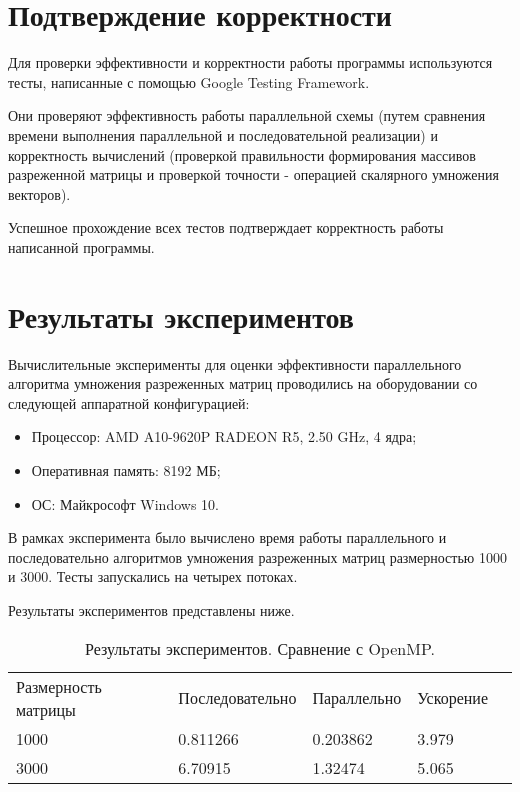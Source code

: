 \documentclass{report}
\begin{document}
\section*{Подтверждение корректности}
Для проверки эффективности и корректности работы программы используются тесты, написанные с помощью Google Testing Framework.
\par Они проверяют эффективность работы параллельной схемы (путем сравнения времени выполнения параллельной и последовательной реализации) и корректность вычислений (проверкой правильности формирования массивов разреженной матрицы и проверкой точности - операцией скалярного умножения векторов).

\par Успешное прохождение всех тестов подтверждает корректность работы написанной программы.

\newpage

\section*{Результаты экспериментов}
Вычислительные эксперименты для оценки эффективности параллельного алгоритма умножения разреженных матриц проводились на оборудовании со следующей аппаратной конфигурацией:

\begin{itemize}
\item Процессор: AMD A10-9620P RADEON R5, 2.50 GHz, 4 ядра;
\item Оперативная память: 8192 МБ;
\item ОС: Майкрософт Windows 10.
\end{itemize}

\par В рамках эксперимента было вычислено время работы параллельного и последовательно алгоритмов умножения разреженных матриц размерностью 1000 и 3000. Тесты запускались на четырех потоках.
\par Результаты экспериментов представлены ниже.

\begin{table}[!h]
\caption{Результаты экспериментов. Сравнение с OpenMP.}
\centering
\begin{tabular}{lllll}
Размерность матрицы & Последовательно & Параллельно & Ускорение  \\
1000        & 0.811266         & 0.203862     & 3.979       \\
3000        & 6.70915         & 1.32474     & 5.065     
\end{tabular}
\end{table}
\end{document}
